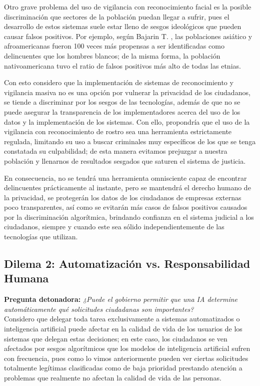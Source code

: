 Otro grave problema del uso de vigilancia con reconocimiento facial es la posible discriminación que sectores de la población puedan llegar a sufrir, pues el desarrollo de estos sistemas suele estar lleno de sesgos ideológicos que pueden causar falsos positivos. Por ejemplo, según Bajarin T. \cite{bajarin_ibm_facial}, las poblaciones asiático y afroamericanas fueron 100 veces más propensas a ser identificadas como delincuentes que los hombres blancos; de la misma forma, la población nativoamericana tuvo el ratio de falsos positivos más alto de todas las etnias.

Con esto considero que la implementación de sistemas de reconocimiento y vigilancia masiva no es una opción por vulnerar la privacidad de los ciudadanos, se tiende a discriminar por los sesgos de las tecnologías, además de que no se puede asegurar la transparencia de los implementadores acerca del uso de los datos y la implementación de los sistemas. Con ello, propondría que el uso de la vigilancia con reconocimiento de rostro sea una herramienta estrictamente regulada, limitando su uso a buscar criminales muy específicos de los que se tenga constatada su culpabilidad; de esta manera evitamos prejuzgar a nuestra población y llenarnos de resultados sesgados que saturen el sistema de justicia.

En consecuencia, no se tendrá una herramienta omnisciente capaz de encontrar delincuentes prácticamente al instante, pero se mantendrá el derecho humano de la privacidad, se protegerán los datos de los ciudadanos de empresas externas poco transparentes, así como se evitarán más casos de falsos positivos causados por la discriminación algorítmica, brindando confianza en el sistema judicial a los ciudadanos, siempre y cuando este sea sólido independientemente de las tecnologías que utilizan.
\subsection*{Dilema 2: Automatización vs. Responsabilidad Humana}
\textbf{Pregunta detonadora:} \textit{¿Puede el gobierno permitir que una IA determine automáticamente qué solicitudes ciudadanas son importantes?}\\[2mm]
Considero que delegar toda tarea exclusivamente a sistemas automatizados o inteligencia artificial puede afectar en la calidad de vida de los usuarios de los sistemas que delegan estas decisiones; en este caso, los ciudadanos se ven afectados por sesgos algorítmicos que los modelos de inteligencia artificial sufren con frecuencia, pues como lo vimos anteriormente pueden ver ciertas solicitudes totalmente legítimas clasificadas como de baja prioridad prestando atención a problemas que realmente no afectan la calidad de vida de las personas.

